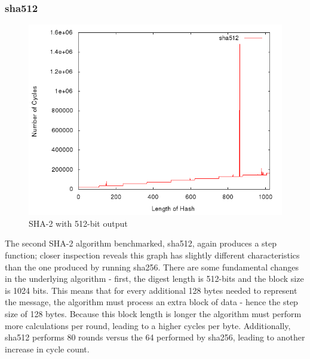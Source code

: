 \documentclass[10pt,a4paper]{article}
\begin{document}
\subsubsection{sha512}
    \begin{figure}[H]
        \begin{center}
            \includegraphics[scale=0.5]{images/sha512.png} 
            \caption{SHA-2 with 512-bit output}
        \end{center}
    \end{figure}

The second SHA-2 algorithm benchmarked, sha512, again produces a step function; closer inspection reveals this graph has slightly different characteristics than the one produced by running sha256.  There are some fundamental changes in the underlying algorithm - first, the digest length is 512-bits and the block size is 1024 bits.  This means that for every additional 128 bytes needed to represent the message, the algorithm must process an extra block of data - hence the step size of 128 bytes.  Because this block length is longer the algorithm must perform more calculations per round, leading to a higher cycles per byte.  Additionally, sha512 performs 80 rounds versus the 64 performed by sha256, leading to another increase in cycle count.
\end{document}
